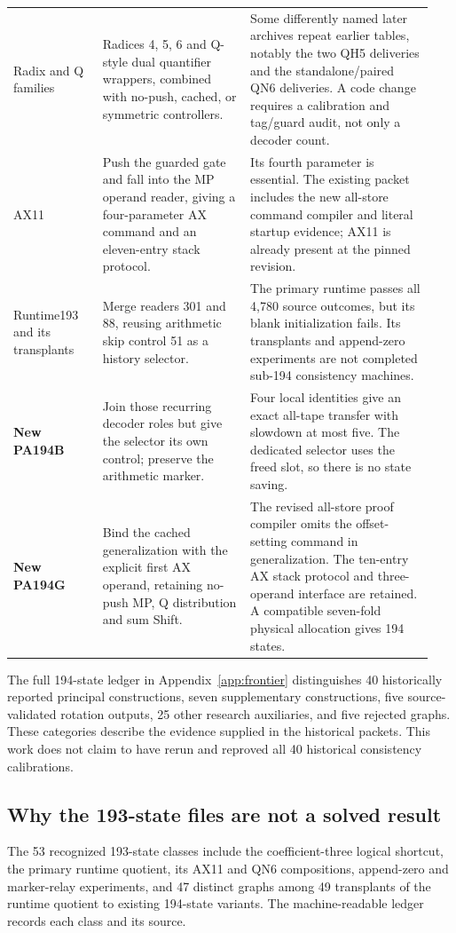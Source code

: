 \documentclass[11pt]{article}
\begin{document}
\begin{longtable}{@{}p{0.20\linewidth}p{0.33\linewidth}p{0.41\linewidth}@{}}
Radix and Q families & Radices 4, 5, 6 and Q-style dual quantifier wrappers, combined with no-push, cached, or symmetric controllers. & Some differently named later archives repeat earlier tables, notably the two QH5 deliveries and the standalone/paired QN6 deliveries. A code change requires a calibration and tag/guard audit, not only a decoder count.\\[4pt]
AX11 & Push the guarded gate and fall into the MP operand reader, giving a four-parameter AX command and an eleven-entry stack protocol. & Its fourth parameter is essential. The existing packet includes the new all-store command compiler and literal startup evidence; AX11 is already present at the pinned revision.\\[4pt]
Runtime193 and its transplants & Merge readers 301 and 88, reusing arithmetic skip control 51 as a history selector. & The primary runtime passes all 4,780 source outcomes, but its blank initialization fails. Its transplants and append-zero experiments are not completed sub-194 consistency machines.\\[4pt]
\textbf{New PA194B} & Join those recurring decoder roles but give the selector its own control; preserve the arithmetic marker. & Four local identities give an exact all-tape transfer with slowdown at most five. The dedicated selector uses the freed slot, so there is no state saving.\\[4pt]
\textbf{New PA194G} & Bind the cached generalization with the explicit first AX operand, retaining no-push MP, Q distribution and sum Shift. & The revised all-store proof compiler omits the offset-setting command in generalization. The ten-entry AX stack protocol and three-operand interface are retained. A compatible seven-fold physical allocation gives 194 states.\\
\bottomrule
\end{longtable}

The full 194-state ledger in Appendix~\ref{app:frontier} distinguishes 40
historically reported principal constructions, seven supplementary
constructions, five source-validated rotation outputs, 25 other research
auxiliaries, and five rejected graphs. These categories describe the
evidence supplied in the historical packets. This work does not claim to
have rerun and reproved all 40 historical consistency calibrations.

\subsection{Why the 193-state files are not a solved result}
The 53 recognized 193-state classes include the coefficient-three logical
shortcut, the primary runtime quotient, its AX11 and QN6 compositions,
append-zero and marker-relay experiments, and 47 distinct graphs among 49
transplants of the runtime quotient to existing 194-state variants.
The machine-readable ledger records each class and its source.
\end{document}
